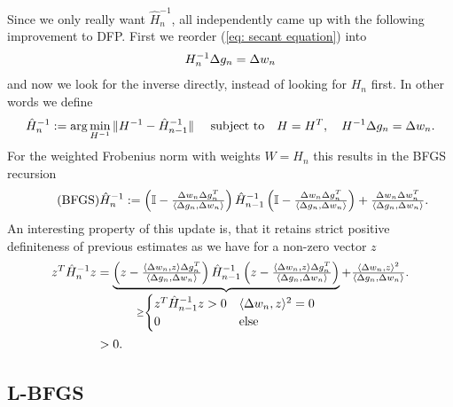 Since we only really want \(\hat{H}_n^{-1}\),
\textcite{broydenConvergenceClassDoublerank1970,fletcherNewApproachVariable1970,goldfarbFamilyVariablemetricMethods1970,shannoConditioningQuasiNewtonMethods1970}
all independently came up with the following improvement to DFP. First we
reorder (\ref{eq: secant equation}) into
\begin{align*}
	H_n^{-1} \Delta g_n = \Delta w_n
\end{align*}
and now we look for the inverse directly, instead of looking for \(H_n\) first.
In other words we define
\begin{align*}
	\hat{H}_n^{-1} &:= \arg\min_{H^{-1}} \| H^{-1} - \hat{H}_{n-1}^{-1}\|
	& \text{ subject to}\quad H=H^T,\quad H^{-1}\Delta g_n =\Delta w_n.
\end{align*}
For the weighted Frobenius norm with weights \(W=H_n\) this results in the BFGS
recursion
\begin{align}
	\label{eq: bfgs}
	\tag{BFGS}
	\hat{H}_n^{-1} :=
	\left(\mathbb{I}-\tfrac{\Delta w_n \Delta g_n^T}{\langle \Delta g_n, \Delta w_n\rangle}\right)
	\hat{H}_{n-1}^{-1}
	\left(\mathbb{I}-\tfrac{ \Delta w_n\Delta g_n^T}{\langle \Delta g_n, \Delta w_n\rangle}\right)
	+ \tfrac{\Delta w_n \Delta w_n^T}{\langle \Delta g_n, \Delta w_n\rangle}.
\end{align}
An interesting property of this update is, that it retains strict positive
definiteness of previous estimates as we have for a non-zero vector \(z\)
\begin{align*}
	z^T \hat{H}_n^{-1} z
	&= \underbrace{
		\left(z-\tfrac{
			\langle\Delta w_n, z\rangle \Delta g_n^T
		}{
			\langle \Delta g_n, \Delta w_n\rangle
		}\right)
		\hat{H}_{n-1}^{-1}
		\left(z-\tfrac{\langle \Delta w_n, z\rangle \Delta g_n^T}{\langle \Delta g_n, \Delta w_n\rangle}\right)
	}_{
	\ge \begin{cases}
		z^T \hat{H}_{n-1}^{-1} z > 0 & \langle\Delta w_n, z\rangle^2 =0 \\
		0 & \text{else}
	\end{cases}
	}
	+ \tfrac{\langle\Delta w_n, z\rangle^2}{\langle \Delta g_n, \Delta w_n\rangle}.
	\\
	&> 0.
\end{align*}

\subsection{L-BFGS}

